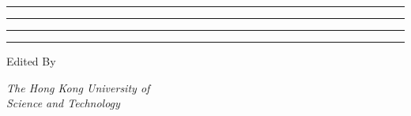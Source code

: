 \documentclass[\projectroot/template.tex]{subfiles}
\begin{document}
 
\makeatletter
\begin{titlepage} %
	
	\centering %
	
	\scshape %
	
	\vspace*{\baselineskip} %
	
	
	\rule{\textwidth}{1.6pt}\vspace*{-\baselineskip}\vspace*{2pt} %
	\rule{\textwidth}{0.4pt} %
	
	\vspace{1.75\baselineskip} %
	
	{\LARGE \@title} %
	
	\vspace{0.75\baselineskip} %
	
	\rule{\textwidth}{0.4pt}\vspace*{-\baselineskip}\vspace{3.2pt} %
	\rule{\textwidth}{1.6pt} %
	
	\vspace{2\baselineskip} %
	
	
	
	\vspace*{3\baselineskip} %
	
	
	Edited By
	
	\vspace{0.5\baselineskip} %
	
	{\scshape\Large \@author} %
	
	\vspace{0.5\baselineskip} %
	
	\textit{The Hong Kong University of\\Science and Technology} %
	
	\vfill %
	
	
	\vspace{0.3\baselineskip} %
	
	\@date
\end{titlepage}
\makeatother
\end{document}
